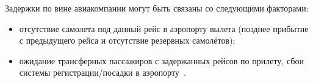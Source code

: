 %

Задержки по вине авиакомпании могут быть связаны со следующими факторами:
\begin{itemize}[label=---]
    \item отсутствие самолета под данный рейс в аэропорту вылета (позднее прибытие с предыдущего рейса и отсутствие резервных самолётов);
    \item ожидание трансферных пассажиров с задержанных рейсов по прилету, сбои системы регистрации/посадки в аэропорту~\cite{voronov}.
\end{itemize}

